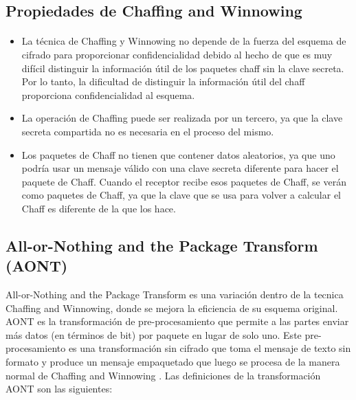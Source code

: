 \documentclass[12pt, a4paper, titlepage]{report}
\begin{document}
        \subsection{Propiedades de Chaffing and Winnowing}
        
        \paragraph{}
        \begin{itemize}
		    \item La técnica de Chaffing y Winnowing no depende de la fuerza del esquema de cifrado para proporcionar confidencialidad debido al hecho de que es muy difícil distinguir la informaci\'on \'util de los paquetes chaff sin la clave secreta. Por lo tanto, la dificultad de distinguir la informaci\'on \'util del chaff proporciona confidencialidad al esquema.
		    \item La operación de Chaffing puede ser realizada por un tercero, ya que la clave secreta compartida no es necesaria en el proceso del mismo.
		    \item Los paquetes de Chaff no tienen que contener datos aleatorios, ya que uno podría usar un mensaje válido con una clave secreta diferente para hacer el paquete de Chaff. Cuando el receptor recibe esos paquetes de Chaff, se verán como paquetes de Chaff, ya que la clave que se usa para volver a calcular el Chaff es diferente de la que los hace.
		\end{itemize}
		
		\subsection{All-or-Nothing and the Package Transform (AONT)}
        
        All-or-Nothing and the Package Transform es una variación dentro de la tecnica Chaffing and Winnowing, donde se mejora la eficiencia de su esquema original. AONT es la transformación de pre-procesamiento que permite a las partes enviar más datos (en términos de bit) por paquete en lugar de solo uno. Este pre-procesamiento es una transformación sin cifrado que toma el mensaje de texto sin formato y produce un mensaje empaquetado que luego se procesa de la manera normal de Chaffing and Winnowing \cite{refAONT}. Las definiciones de la transformación AONT son las siguientes:
        
\end{document}

